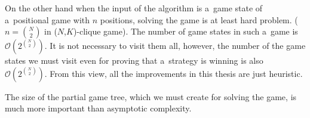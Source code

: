 On the other hand when the input of the algorithm is a~game state
of a~positional game with $n$ positions, solving the game is at least hard problem.
($n = {N \choose 2}$ in ($N$,$K$)-clique game). The number of game states in
such a~game is $\mathcal{O}(2^{N \choose 2})$. It is not necessary to visit them all,
however, the number of the game states we must visit even for proving that a~strategy
is winning is also $\mathcal{O}(2^{N \choose 2})$. From this view, all the improvements in this
thesis are just heuristic.

The size of the partial game tree, which we must create for solving the game, is 
much more important than asymptotic complexity.


